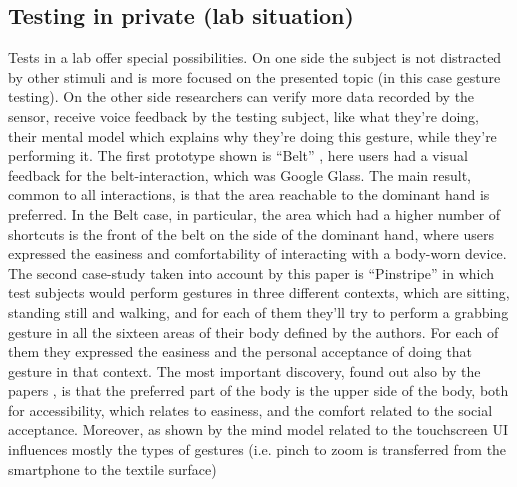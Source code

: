 \documentclass{sigchi}
\begin{document}
\subsection{Testing in private (lab situation)}
Tests in a lab offer special possibilities. On one side the subject is not distracted by other stimuli and is more focused on the presented topic (in this case gesture testing). On the other side researchers can verify more data recorded by the sensor, receive voice feedback by the testing subject, like what they’re doing, their mental model which explains why they’re doing this gesture, while they’re performing it.
The first prototype shown is “Belt” \cite{belt}, here users had a visual feedback for the belt-interaction, which was Google Glass. The main result, common to all interactions, is that the area reachable to the dominant hand is preferred. In the Belt case, in particular, the area which had a higher number of shortcuts is the front of the belt on the side of the dominant hand, where users expressed the easiness and comfortability of interacting with a body-worn device. The second case-study taken into account by this paper is “Pinstripe” \cite{pinstripe} in which test subjects would perform gestures in three different contexts, which are sitting, standing still and walking, and for each of them they’ll try to perform a grabbing gesture in all the sixteen areas of their body defined by the authors. For each of them they expressed the easiness and the personal acceptance of doing that gesture in that context. The most important discovery, found out also by the papers \cite{social-comfort, belt,more-touch}, is that the preferred part of the body is the upper side of the body, both for accessibility, which relates to easiness, and the comfort related to the social acceptance.
Moreover, as shown by \cite{more-touch} the mind model related to the touchscreen UI influences mostly the types of gestures (i.e. pinch to zoom is transferred from the smartphone to the textile surface)
\end{document}
